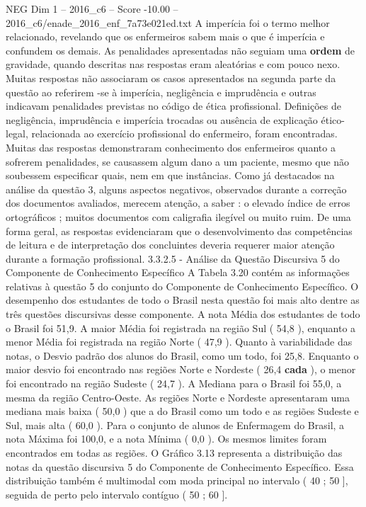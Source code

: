 \begin{textsample}{NEG Dim 1 – 2016\_c6 – Score -10.00 – 2016\_c6/enade\_2016\_enf\_7a73e021ed.txt}
A imperícia foi o termo melhor relacionado, revelando que os enfermeiros sabem mais o que é imperícia e confundem os demais.
As penalidades apresentadas não seguiam uma \textbf{ordem} de gravidade, quando descritas nas respostas eram aleatórias e com pouco nexo.
Muitas respostas não associaram os casos apresentados na segunda parte da questão ao referirem -se à imperícia, negligência e imprudência e outras indicavam penalidades previstas no código de ética profissional.
Definições de negligência, imprudência e imperícia trocadas ou ausência de explicação ético-legal, relacionada ao exercício profissional do enfermeiro, foram encontradas.
Muitas das respostas demonstraram conhecimento dos enfermeiros quanto a sofrerem penalidades, se causassem algum dano a um paciente, mesmo que não soubessem especificar quais, nem em que instâncias.
Como já destacados na análise da questão 3, alguns aspectos negativos, observados durante a correção dos documentos avaliados, merecem atenção, a saber : o elevado índice de erros ortográficos ; muitos documentos com caligrafia ilegível ou muito ruim.
De uma forma geral, as respostas evidenciaram que o desenvolvimento das competências de leitura e de interpretação dos concluintes deveria requerer maior atenção durante a formação profissional. 3.3.2.5 - Análise da Questão Discursiva 5 do Componente de Conhecimento Específico A Tabela 3.20 contém as informações relativas à questão 5 do conjunto do Componente de Conhecimento Específico.
O desempenho dos estudantes de todo o Brasil nesta questão foi mais alto dentre as três questões discursivas desse componente.
A nota Média dos estudantes de todo o Brasil foi 51,9.
A maior Média foi registrada na região Sul ( 54,8 ), enquanto a menor Média foi registrada na região Norte ( 47,9 ).
Quanto à variabilidade das notas, o Desvio padrão dos alunos do Brasil, como um todo, foi 25,8.
Enquanto o maior desvio foi encontrado nas regiões Norte e Nordeste ( 26,4 \textbf{cada} ), o menor foi encontrado na região Sudeste ( 24,7 ).
A Mediana para o Brasil foi 55,0, a mesma da região Centro-Oeste.
As regiões Norte e Nordeste apresentaram uma mediana mais baixa ( 50,0 ) que a do Brasil como um todo e as regiões Sudeste e Sul, mais alta ( 60,0 ).
Para o conjunto de alunos de Enfermagem do Brasil, a nota Máxima foi 100,0, e a nota Mínima ( 0,0 ).
Os mesmos limites foram encontrados em todas as regiões.
O Gráfico 3.13 representa a distribuição das notas da questão discursiva 5 do Componente de Conhecimento Específico.
Essa distribuição também é multimodal com moda principal no intervalo ( 40 ; 50 ], seguida de perto pelo intervalo contíguo ( 50 ; 60 ].

\end{textsample}
